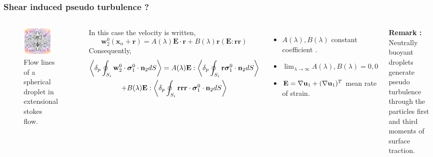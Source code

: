 \documentclass{sintefbeamer}
\begin{document}
\begin{frame}
  \frametitle{Shear induced pseudo turbulence ? }
  \begin{columns}
    \begin{figure}
      \includegraphics[width=0.8\textwidth]{image/Shear_Stokes.png}
      \caption{Flow lines of a spherical droplet in extensional stokes flow. }
    \end{figure}

      In this case the velocity is written, 
      \begin{equation*}
        \textbf{w}_ 2^0(\textbf{x}_\alpha + \textbf{r})
        = A(\lambda) \textbf{E} \cdot \textbf{r}
        +  B(\lambda) \textbf{r}(\textbf{E} : \textbf{rr})
      \end{equation*}
Consequently, 
\begin{multline*}
  \left<\delta_p \oint_{S_{i}} \textbf{w}_2^0 \cdot \bm{\sigma}_1^0\cdot\textbf{n}_2 dS\right>
  =
  A(\lambda)\textbf{E} : \left<\delta_p \oint_{S_{i}} \textbf{r} \bm{\sigma}_1^0\cdot\textbf{n}_2 dS\right>\\
  + B(\lambda)\textbf{E} : \left<\delta_p \oint_{S_{i}} \textbf{rrr}\cdot \bm{\sigma}_1^0\cdot\textbf{n}_2 dS\right>
\end{multline*}

\begin{itemize}
  \item $A(\lambda), B(\lambda)$ constant coefficient \citep{leal2007advanced}.
  \item $\lim_{\lambda\to\infty}A(\lambda), B(\lambda) = 0,0$ 
  \item $\textbf{E} = \mathbf{\nabla} \textbf{u}_1 + (\mathbf{\nabla} \textbf{u}_1)^T$ mean rate of strain. 
\end{itemize}
\textbf{Remark :}
Neutrally buoyant droplets generate pseudo turbulence through the particles first and third moments of surface traction. 
\end{columns}
  

\end{frame}
\end{document}
